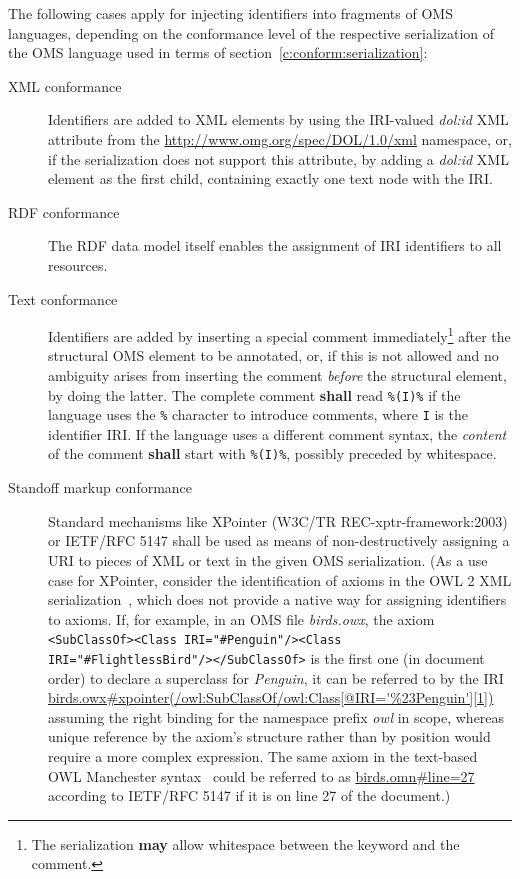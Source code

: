 \documentclass[10pt,fleqn,final]{scrreprt}
\newcommand{\cbs}[0]{\color{red}\xspace} %
\newcommand{\cbe}[0]{\color{black}\xspace} %
\newcommand*{\shall}{\textbf{shall}\xspace}
\newcommand*{\may}{\textbf{may}\xspace}
\newcommand{\nisref}[1]{#1}
\newenvironment{definitions}[0]{\medskip }{}
\begin{document}
\begin{definitions}
The following cases apply for injecting identifiers into fragments of OMS languages, depending on the conformance level of the respective serialization of the OMS language used in terms of section~\ref{c:conform:serialization}:
\begin{description}
\item[XML conformance] Identifiers are added to XML elements by using the IRI-valued \textit{dol:id} XML attribute from the \url{http://www.omg.org/spec/DOL/1.0/xml} namespace, or, if the serialization does not support this attribute, by adding a \textit{dol:id} XML element as the first child, containing exactly one text node with the IRI.
\item[RDF conformance] The RDF data model itself enables the assignment of IRI identifiers to all resources.
\item[Text conformance] Identifiers are added by inserting a special comment immediately\footnote{The serialization \may allow whitespace between the keyword and the comment.} after the structural OMS element to be annotated, or, if this is not allowed and no ambiguity arises from inserting the comment \emph{before} the structural element, by doing the latter.  The complete comment \shall read \texttt{\%(I)\%} if the language uses the \texttt{\%} character to introduce comments, where \texttt{I} is the identifier IRI.  If the language uses a different comment syntax, the \emph{content} of the comment \shall start with \texttt{\%(I)\%}, possibly preceded by whitespace.
\item[Standoff markup conformance] Standard mechanisms like XPointer (\nisref{W3C/TR REC-xptr-framework:2003}) or \nisref{IETF/RFC 5147} shall be used as means of non-destructively assigning a URI to pieces of XML or text in the given OMS serialization.  {\cbs (As a use case for XPointer, consider the identification of axioms in the OWL 2 XML serialization~\cite{W3C:REC-owl2-xml-serialization-20121211}, which does not provide a native way for assigning identifiers to axioms.  If, for example, in an OMS file \textit{birds.owx}, the axiom \texttt{<SubClassOf><Class IRI="\#Penguin"/><Class IRI="\#FlightlessBird"/></SubClassOf>} is the first one (in document order) to declare a superclass for \textit{Penguin}, it can be referred to by the IRI \url{birds.owx\#xpointer(/owl:SubClassOf/owl:Class[@IRI='\%23Penguin'][1])} assuming the right binding for the namespace prefix \textit{owl} in scope, whereas unique reference by the axiom's structure rather than by position would require a more complex expression.
The same axiom in the text-based OWL Manchester syntax~\cite{W3C:NOTE-owl2-manchester-syntax-20091027} could be referred to as \url{birds.omn\#line=27} according to \nisref{IETF/RFC 5147} if it is on line 27 of the document.)\cbe}
\end{description}


\end{definitions}
\end{document}
